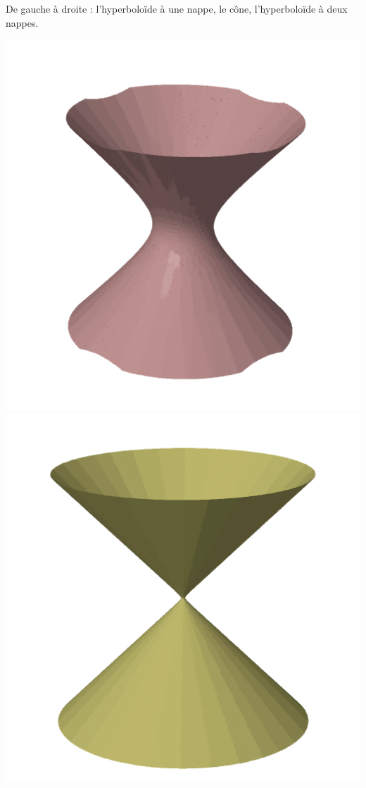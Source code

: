 \documentclass[11pt, class=report,crop=false]{standalone}
\begin{document}
\begin{exemple}
\begin{itemize}
\begin{itemize}
    \end{itemize}
    
\end{itemize}  

De gauche à droite : l'hyperboloïde à une nappe, le cône, l'hyperboloïde à deux nappes.

\begin{center}
  \includegraphics[scale=0.25]{figures/fig-gradient-06d}
  \includegraphics[scale=0.23]{figures/fig-gradient-06c}  

\end{center}
\end{exemple}
\end{document}

